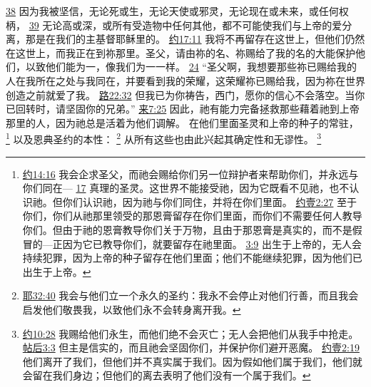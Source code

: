 \documentclass[12pt, a4paper, oneside]{ctexart}
\begin{document}
{		\href{https://biblehub.com/romans/8-38.htm}{38} 因为我被坚信，无论死或生，无论天使或邪灵，无论现在或未来，或任何权柄，
		\href{https://biblehub.com/romans/8-39.htm}{39} 无论高或深，或所有受造物中任何其他，都不可能使我们与上帝的爱分离，那是在我们的主基督耶稣里的。
		\href{https://biblehub.com/john/17-11.htm}{约17:11} 我将不再留存在这世上，但他们仍然在这世上，而我正在到祢那里。圣父，请由祢的名、祢赐给了我的名的大能保护他们，以致他们能为一，像我们为一一样。
		\href{https://biblehub.com/john/17-24.htm}{24} “圣父啊，我想要那些祢已赐给我的人在我所在之处与我同在，并要看到我的荣耀，这荣耀祢已赐给我，因为祢在世界创造之前就爱了我。
		\href{https://biblehub.com/luke/22-32.htm}{路22:32} 但我已为你祷告，西门，愿你的信心不会落空。当你已回转时，请坚固你的兄弟。”
		\href{https://biblehub.com/hebrews/7-25.htm}{来7:25} 因此，祂有能力完备拯救那些藉着祂到上帝那里的人，因为祂总是活着为他们调解。
	}
	在他们里面圣灵和上帝的种子的常驻，
	\footnote {
		\href{https://biblehub.com/john/14-16.htm}{约14:16} 我会企求圣父，而祂会赐给你们另一位辩护者来帮助你们，并永远与你们同在---
		\href{https://biblehub.com/john/14-17.htm}{17} 真理的圣灵。这世界不能接受祂，因为它既看不见祂，也不认识祂。但你们认识祂，因为祂与你们同住，并将在你们里面。
		\href{https://biblehub.com/1_john/2-27.htm}{约壹2:27} 至于你们，你们从祂那里领受的那恩膏留存在你们里面，而你们不需要任何人教导你们。但由于祂的恩膏教导你们关于万物，且由于那恩膏是真实的，而不是假冒的---正因为它已教导你们，就要留存在祂里面。
		\href{https://biblehub.com/1_john/3-9.htm}{3:9} 出生于上帝的，无人会持续犯罪，因为上帝的种子留存在他们里面；他们不能继续犯罪，因为他们已出生于上帝。
	}
	以及恩典圣约的本性：
	\footnote {
		\href{https://biblehub.com/jeremiah/32-40.htm}{耶32:40} 我会与他们立一个永久的圣约：我永不会停止对他们行善，而且我会启发他们敬畏我，以致他们永不会转身离开我。
	}
	从所有这些也由此兴起其确定性和无谬性。
	\footnote {
		\href{https://biblehub.com/john/10-28.htm}{约10:28} 我赐给他们永生，而他们绝不会灭亡；无人会把他们从我手中抢走。
		\href{https://biblehub.com/2_thessalonians/3-3.htm}{帖后3:3} 但主是信实的，而且祂会坚固你们，并保护你们避开恶魔。
		\href{https://biblehub.com/1_john/2-19.htm}{约壹2:19} 他们离开了我们，但他们并不真实属于我们。因为假如他们属于我们，他们就会留在我们身边；但他们的离去表明了他们没有一个属于我们。
	}
\end{document}
